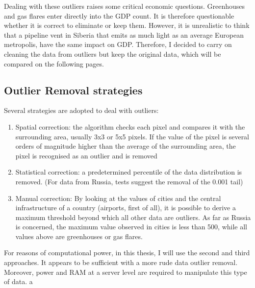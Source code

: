 Dealing with these outliers raises some critical economic questions. Greenhouses and gas flares enter directly into the GDP count. It is therefore questionable whether it is correct to eliminate or keep them. However, it is unrealistic to think that a pipeline vent in Siberia that emits as much light as an average European metropolis, have the same impact on GDP. Therefore, I decided to carry on cleaning the data from outliers but keep the original data, which will be compared on the following pages. 

\subsection{Outlier Removal strategies}

Several strategies are adopted to deal with outliers:
\begin{enumerate}
    \item Spatial correction: the algorithm checks each pixel and compares it with the surrounding area, usually 3x3 or 5x5 pixels. If the value of the pixel is several orders of magnitude higher than the average of the surrounding area, the pixel is recognised as an outlier and is removed
    \item Statistical correction: a predetermined percentile of the data distribution is removed. (For data from Russia, tests suggest the removal of the 0.001 tail)
    \item Manual correction: By looking at the values of cities and the central infrastructure of a country (airports, first of all), it is possible to derive a maximum threshold beyond which all other data are outliers. As far as Russia is concerned, the maximum value observed in cities is less than 500, while all values above are greenhouses or gas flares.
\end{enumerate}

For reasons of computational power, in this thesis, I will use the second and third approaches. It appears to be sufficient with a more rude data outlier removal. Moreover, power and RAM at a server level are required to manipulate this type of data.
a
